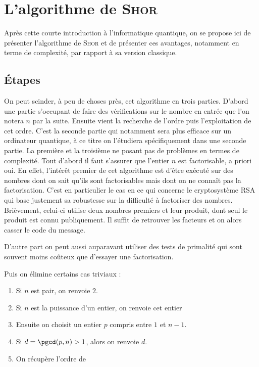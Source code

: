 \documentclass[a4paper,11pt]{tipe}
\begin{document}
\chapter{L'algorithme de \textsc{Shor}}
Après cette courte introduction à l'informatique quantique, on se propose ici
de présenter l'algorithme de \textsc{Shor} et de présenter ces avantages,
notamment en terme de complexité, par rapport à sa version classique.
\section{Étapes}
On peut scinder, à peu de choses près, cet algorithme en trois parties. D'abord
une partie s'occupant de faire des vérifications sur le nombre en entrée que
l'on notera $n$ par la suite. Ensuite vient la recherche de l'ordre puis
l'exploitation de cet ordre. C'est la seconde partie qui notamment sera plus
efficace sur un ordinateur quantique, à ce titre on l'étudiera spécifiquement
dans une seconde partie. La première et la troisième ne posant pas
de problèmes en termes de complexité.
Tout d'abord il faut s'assurer que l'entier $n$ est factorisable, a priori oui.
En effet, l'intérêt premier de cet algorithme est d'être exécuté sur des
nombres dont on sait qu'ils sont factorisables mais dont on ne connaît pas la
factorisation. C'est en particulier le cas en ce qui concerne le cryptosystème
RSA qui base justement sa robustesse sur la difficulté à factoriser des
nombres. Brièvement, celui-ci utilise deux nombres premiers et leur produit,
dont seul le produit est connu publiquement. Il suffit de retrouver les
facteurs et on alors \og casser \fg{} le code du message.

D'autre part on peut aussi auparavant utiliser des tests de primalité qui sont
souvent moins coûteux que d'essayer une factorisation.

Puis on élimine certains cas triviaux :
\begin{enumerate}
 \item Si $n$ est pair, on renvoie $2$.
 \item Si $n$ est la puissance d'un entier, on renvoie cet entier
 \item \label{choix_de_p}Ensuite on choisit un entier $p$ compris entre $1$ et
$n-1$.
 \item Si $d = \pgcd(p,n) > 1$, alors on renvoie $d$.  
 \item On récupère l'ordre de 
\end{enumerate} 
\end{document}

